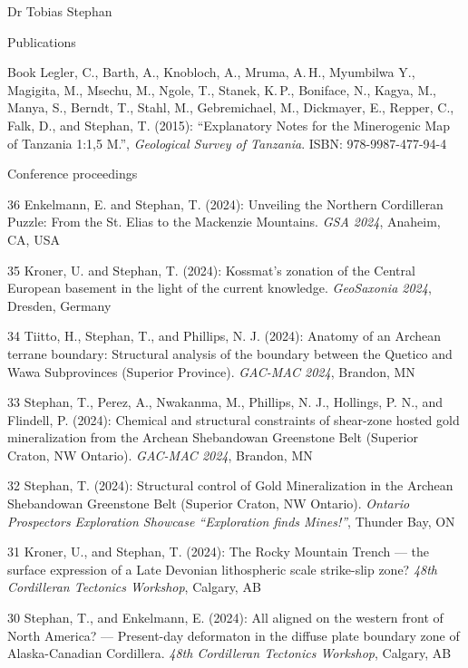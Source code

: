 \documentclass[10pt, paper=letter]{scrartcl} %
\begin{document}
\begin{cv}{Dr Tobias Stephan}
\begin{cvlist}{Publications}
% 
    
    \item[Book] Legler, C., Barth, A., Knobloch, A., Mruma, A.\,H., Myumbilwa Y.,  Magigita, M., Msechu, M., Ngole, T., Stanek, K.\,P., Boniface, N., Kagya, M., Manya, S., Berndt, T., Stahl, M., Gebremichael, M., Dickmayer, E., Repper, C., Falk, D., and Stephan, T. (2015): \enquote{Explanatory Notes for the Minerogenic Map of Tanzania 1:1,5 M.}, \textit{Geological Survey of Tanzania}. ISBN: 978-9987-477-94-4	 
\end{cvlist}



\begin{cvlist}{Conference proceedings} %
    \item[36] Enkelmann, E. and Stephan, T. (2024): Unveiling the Northern Cordilleran Puzzle: From the St. Elias to the Mackenzie Mountains. \textit{GSA 2024}, Anaheim, CA, USA
    \item[35] Kroner, U. and Stephan, T. (2024): Kossmat’s zonation of the Central European basement in the light of the current knowledge. \textit{GeoSaxonia 2024}, Dresden, Germany
    \item[34] Tiitto, H., Stephan, T., and Phillips, N. J. (2024): Anatomy of an Archean terrane boundary: Structural analysis of the boundary between the Quetico and Wawa Subprovinces (Superior Province). \textit{GAC-MAC 2024}, Brandon, MN
    \item[33] Stephan, T., Perez, A., Nwakanma, M., Phillips, N. J., Hollings, P. N., and Flindell, P. (2024): Chemical and structural constraints of shear-zone hosted gold mineralization from the Archean Shebandowan Greenstone Belt (Superior Craton, NW Ontario). \textit{GAC-MAC 2024}, Brandon, MN   
    \item[32] Stephan, T. (2024): Structural control of Gold Mineralization in the Archean Shebandowan Greenstone Belt (Superior Craton, NW Ontario). \textit{Ontario Prospectors Exploration Showcase \enquote{Exploration finds Mines!}}, Thunder Bay, ON   
     \item[31] Kroner, U., and Stephan, T. (2024): The Rocky Mountain Trench --- the surface expression of a Late Devonian lithospheric scale strike-slip zone? \textit{48th Cordilleran Tectonics Workshop}, Calgary, AB
     \item[30] Stephan, T., and Enkelmann, E. (2024): All aligned on the western front of North America? --– Present-day deformaton in the diffuse plate boundary zone of Alaska-Canadian Cordillera. \textit{48th Cordilleran Tectonics Workshop}, Calgary, AB

\end{cvlist}
\end{cv}
\end{document}
